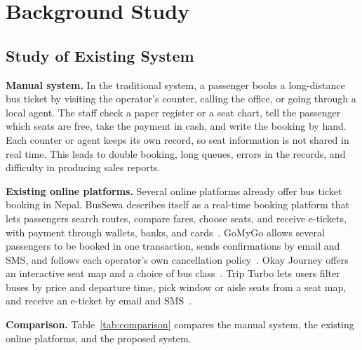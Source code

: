 
\section{Background Study}

\subsection{Study of Existing System}

\textbf{Manual system.} In the traditional system, a passenger books a long-distance bus ticket by visiting the operator's counter, calling the office, or going through a local agent. The staff check a paper register or a seat chart, tell the passenger which seats are free, take the payment in cash, and write the booking by hand. Each counter or agent keeps its own record, so seat information is not shared in real time. This leads to double booking, long queues, errors in the records, and difficulty in producing sales reports.

\textbf{Existing online platforms.} Several online platforms already offer bus ticket booking in Nepal. BusSewa describes itself as a real-time booking platform that lets passengers search routes, compare fares, choose seats, and receive e-tickets, with payment through wallets, banks, and cards~\cite{bussewa}. GoMyGo allows several passengers to be booked in one transaction, sends confirmations by email and SMS, and follows each operator's own cancellation policy~\cite{gomygo}. Okay Journey offers an interactive seat map and a choice of bus class~\cite{okayjourney}. Trip Turbo lets users filter buses by price and departure time, pick window or aisle seats from a seat map, and receive an e-ticket by email and SMS~\cite{tripturbo}.

\textbf{Comparison.} Table~\ref{tab:comparison} compares the manual system, the existing online platforms, and the proposed system.

